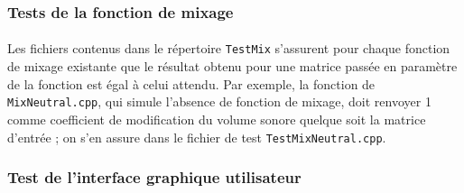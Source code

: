 \subsubsection{Tests de la fonction de mixage}
\paragraph{}
Les fichiers contenus dans le répertoire \verb!TestMix! s'assurent
pour chaque fonction de mixage existante que le résultat obtenu pour
une matrice passée en paramètre de la fonction est égal à celui
attendu. Par exemple, la fonction de \verb!MixNeutral.cpp!, qui simule
l'absence de fonction de mixage, doit renvoyer 1 comme coefficient de
modification du volume sonore quelque soit la matrice d'entrée ; on
s'en assure dans le fichier de test \verb!TestMixNeutral.cpp!.

\subsubsection{Test de l'interface graphique utilisateur}
